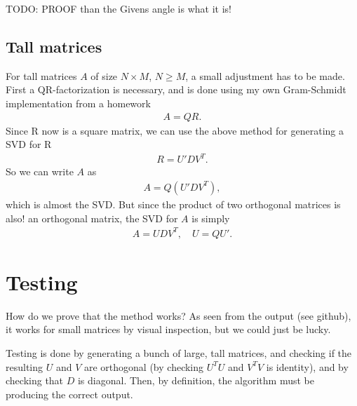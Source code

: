 \documentclass{article}
\begin{document}
    TODO: PROOF than the Givens angle is what it is!
    
    \subsection{Tall matrices}
    For tall matrices $ A $ of size $ N\times M $, $ N\geq M $, a small adjustment has to be made. First a QR-factorization is necessary, and is done using my own Gram-Schmidt implementation from a homework
    \begin{align}
    	A=QR.
    \end{align}
    Since R now is a square matrix, we can use the above method for generating a SVD for R
    \begin{align}
    	R = U'DV^T.
    \end{align}
	So we can write $ A $ as
	\begin{align}
		A = Q(U'DV^T),
	\end{align}
	which is almost the SVD. But since the product of two orthogonal matrices is also! an orthogonal matrix, the SVD for $ A $ is simply
	\begin{align}
		A = UDV^T,\quad U = QU'.
	\end{align}
    
    \section{Testing}
    How do we prove that the method works? As seen from the output (see github), it works for small matrices by visual inspection, but we could just be lucky.
    
    Testing is done by generating a bunch of large, tall matrices, and checking if the resulting $ U $ and $ V $ are orthogonal (by checking $ U^TU $ and $ V^TV $ is identity), and by checking that $ D $ is diagonal. Then, by definition, the algorithm must be producing the correct output. 
    
\end{document}
